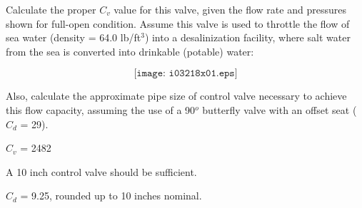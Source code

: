 

Calculate the proper $C_v$ value for this valve, given the flow rate and pressures shown for full-open condition.  Assume this valve is used to throttle the flow of sea water (density = 64.0 lb/ft$^{3}$) into a desalinization facility, where salt water from the sea is converted into drinkable (potable) water:

$$\texttt{[image: i03218x01.eps]}$$

Also, calculate the approximate pipe size of control valve necessary to achieve this flow capacity, assuming the use of a 90$^{o}$ butterfly valve with an offset seat ($C_d$ = 29).







$C_v$ = 2482
 
\vskip 10pt

A 10 inch control valve should be sufficient.







$C_d$ = 9.25, rounded up to 10 inches nominal.





